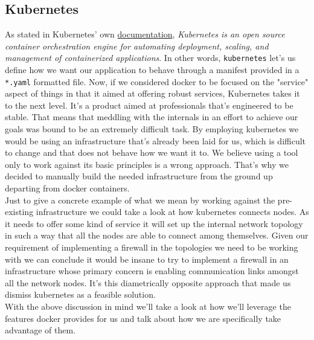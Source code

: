         \subsection{Kubernetes}
            As stated in Kubernetes' own \href{https://kubernetes.io/docs/home/}{documentation}, \textit{Kubernetes is an open source container orchestration engine for automating deployment, scaling, and management of containerized applications}. In other words, \texttt{kubernetes} let's us define how we want our application to behave through a manifest provided in a \texttt{*.yaml} formatted file. Now, if we considered docker to be focused on the "service" aspect of things in that it aimed at offering robust services, Kubernetes takes it to the next level. It's a product aimed at professionals that's engineered to be stable. That means that meddling with the internals in an effort to achieve our goals was bound to be an extremely difficult task. By employing kubernetes we would be using an infrastructure that's already been laid for us, which is difficult to change and that does not behave how we want it to. We believe using a tool only to work against its basic principles is a wrong approach. That's why we decided to manually build the needed infrastructure from the ground up departing from docker containers.\\

            Just to give a concrete example of what we mean by working against the pre-existing infrastructure we could take a look at how kubernetes connects nodes. As it needs to offer some kind of service it will set up the internal network topology in such a way that all the nodes are able to connect among themselves. Given our requirement of implementing a firewall in the topologies we need to be working with we can conclude it would be insane to try to implement a firewall in an infrastructure whose primary concern is enabling communication links amongst all the network nodes. It's this diametrically opposite approach that made us dismiss kubernetes as a feasible solution.\\

        With the above discussion in mind we'll take a look at how we'll leverage the features docker provides for us and talk about how we are specifically take advantage of them.